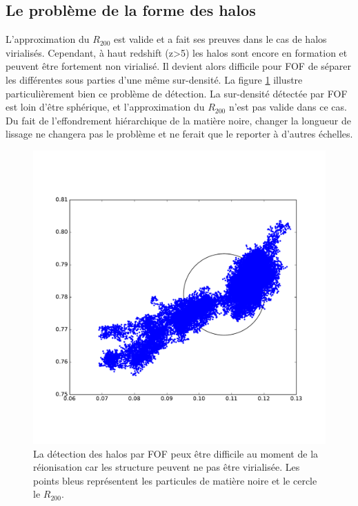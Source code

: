 \subsection{Le problème de la forme des halos}


L'approximation du $R_{200}$ est valide et a fait ses preuves dans le cas de halos virialisés.  %
Cependant, à haut redshift (z>5) les halos sont encore en formation et peuvent être fortement non virialisé.
Il devient alors difficile pour \ac{FOF} de séparer les différentes sous parties d'une même sur-densité.
La figure \ref{fig:part_halo} illustre particulièrement bien ce problème de détection.
La sur-densité détectée par \ac{FOF} est loin d'être sphérique, et l'approximation du $R_{200}$ n'est pas valide dans ce cas.
Du fait de l'effondrement hiérarchique de la matière noire, changer la longueur de lissage ne changera pas le problème et ne ferait que le reporter à d'autres échelles.

\begin{figure}
	\centering
	\includegraphics[width=.75\textwidth]{img/03/part_halo_R200.pdf} 
    \caption[Détection des halos]{La détection des halos par \ac{FOF} peux être difficile au moment de la réionisation car les structure peuvent ne pas être virialisée.
    Les points bleus représentent les particules de matière noire et le cercle le $R_{200}$.
 	\label{fig:part_halo}}
\end{figure}


